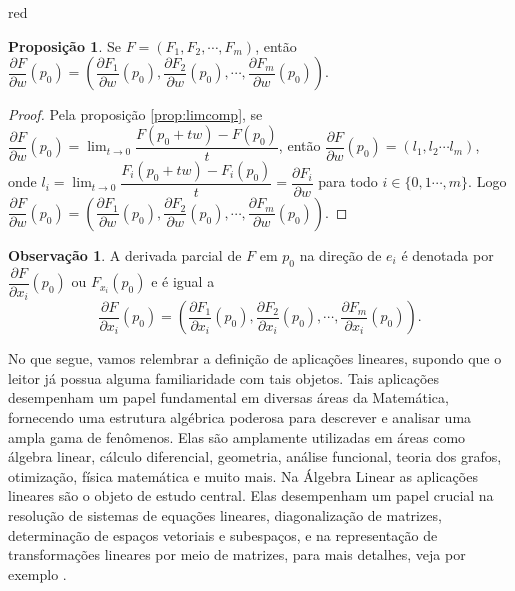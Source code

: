 \documentclass[12pt,leqno,twoside]{amsart}
\theoremstyle{definition}
\newtheorem{proposicao}{Proposição}[section]
\newtheorem*{obs}{Observação}
\begin{document}
\begin{color}{red}
\begin{proposicao}
	\label{prop:difcomp}
	Se $F = \left(F_1, F_2,\cdots,F_m\right)$, então $\dfrac{\partial F}{\partial w} (p_0) = \left( \dfrac{\partial F_1}{\partial w} (p_0), \dfrac{\partial F_2}{\partial w} (p_0), \cdots, \dfrac{\partial F_m}{\partial w} (p_0) \right)$.
\end{proposicao}
\begin{proof}
	Pela proposição \ref{prop:limcomp}, se $\dfrac{\partial F}{\partial w} (p_0) = \displaystyle\lim_{t \to 0} \dfrac{F(p_0+tw)-F(p_0)}{t}$, então $\dfrac{\partial F}{\partial w} (p_0)  = (l_1,l_2\cdots l_m)$, onde $l_i = \displaystyle\lim_{t \to 0} \dfrac{F_i(p_0+tw)-F_i(p_0)}{t} = \dfrac{\partial F_i}{\partial w}$ para todo $i\in \{0,1\cdots, m\}$. Logo $\dfrac{\partial F}{\partial w} (p_0) = \left( \dfrac{\partial F_1}{\partial w} (p_0), \dfrac{\partial F_2}{\partial w} (p_0), \cdots, \dfrac{\partial F_m}{\partial w} (p_0) \right)$.
\end{proof}

\vspace{0.3cm}

\begin{obs}
	A derivada parcial de $F$ em $p_0$ na direção de $e_i$ é denotada por $\dfrac{\partial F}{\partial x_i}(p_0)$ ou $F_{x_i}(p_0)$ e é igual a
	$$\dfrac{\partial F}{\partial x_i} (p_0) = \left( \dfrac{\partial F_1}{\partial x_i} (p_0), \dfrac{\partial F_2}{\partial x_i} (p_0), \cdots, \dfrac{\partial F_m}{\partial x_i} (p_0) \right).$$
\end{obs}

\vspace{0.3cm}

No que segue, vamos relembrar a definição de aplicações lineares, supondo que o leitor já possua alguma familiaridade com tais objetos. Tais aplicações  desempenham um papel fundamental em diversas áreas da Matemática, fornecendo uma estrutura algébrica poderosa para descrever e analisar uma ampla gama de fenômenos. Elas são amplamente utilizadas em áreas como álgebra linear, cálculo diferencial,  geometria, análise funcional, teoria dos grafos, otimização, física matemática e muito mais. Na Álgebra Linear as aplicações lineares são o objeto de estudo central. Elas desempenham um papel crucial na resolução de sistemas de equações lineares, diagonalização de matrizes, determinação de espaços vetoriais e subespaços, e na representação de transformações lineares por meio de matrizes, para mais detalhes, veja por exemplo \cite{E3}.


\end{color}
\end{document}
